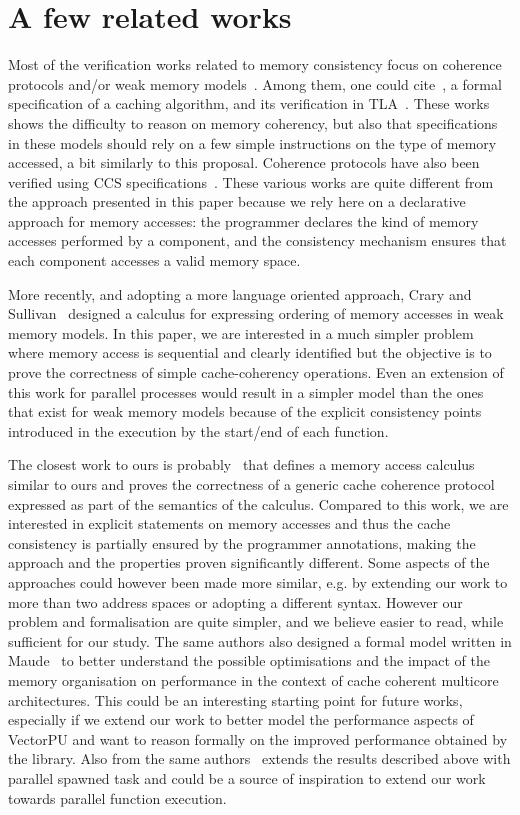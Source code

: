\documentclass[preprint,12pt]{elsarticle}
\begin{document}
\section{A few related works}\label{sec:RW} 
Most of the verification works related to memory consistency focus on coherence 
protocols 
and/or 
weak memory models~\cite{pong1997verification}. 
Among them, one could cite~\cite{Gerth1999}, a formal specification of a caching 
algorithm, and its verification in TLA~\cite{Ladkin1999}. These works shows the 
difficulty to reason on memory coherency, but also that specifications in these models 
should rely on a few simple instructions on the type of memory accessed, a bit similarly 
to this proposal.
Coherence protocols have also been verified using CCS specifications~\cite{Barrio01}. 
These various works are quite different from the approach presented in this paper because 
we rely here on a declarative approach for memory accesses: the programmer declares the 
kind of memory accesses performed by a component, and the consistency mechanism ensures 
that each component accesses a valid memory space.

More recently, and adopting a more language oriented approach, Crary and 
Sullivan~\cite{Crary:POPL:2015} designed 
a calculus for expressing ordering of memory accesses in weak memory models. In this paper, we 
are interested in a much simpler problem where memory access is  sequential 
and clearly identified but the objective is to prove the correctness of simple cache-coherency operations. 
Even an  extension of this work for parallel processes would  result in a 
simpler model than the ones that exist for weak memory models because of the explicit 
consistency points introduced in the execution by the start/end of each function. 

The closest work to ours is probably~\cite{BJPTSAC16} that defines a memory access calculus similar to ours and proves the 
correctness of a generic cache coherence protocol expressed as part of the semantics of 
the calculus. Compared to this work, we are interested in explicit statements on memory 
accesses and thus the cache consistency is partially ensured  by the programmer 
annotations, making the approach and the properties proven significantly different. Some 
aspects of the approaches could however been made more similar, e.g. by extending our 
work to more than two address spaces or adopting a different  syntax. However our problem 
and formalisation are quite simpler, and we 
believe easier to read, while sufficient for our study.
The same authors also designed a formal model written in Maude~\cite{BJPTMaude16} to 
better understand the possible 
optimisations and the impact of the memory organisation on performance in the context of 
cache coherent multicore architectures. This could be an interesting starting point for 
future works, especially if we 
extend our work to better model the performance aspects of VectorPU and want to reason 
formally on the improved performance obtained by the library. Also from the same authors~\cite{Bijo2017} extends the results described above with parallel spawned task and could be a source of inspiration  to extend our work towards parallel function execution.
\end{document}
